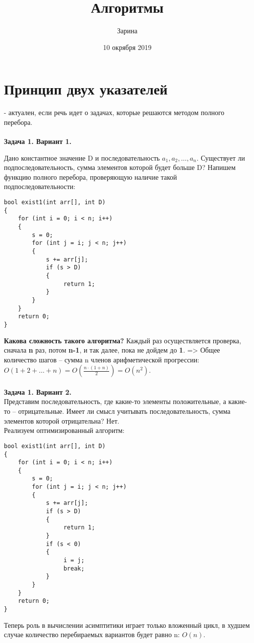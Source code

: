 \documentclass[a4paper,12pt]{article}
\author{Зарина}
\title{Алгоритмы}
\date{10 окрября 2019}
\begin{document}
\section {Принцип двух указателей}
- актуален, если речь идет о задачах, которые решаются методом полного перебора. \\ \\
\textbf{Задача 1. Вариант 1.} 

Дано константное значение D и последовательность {\bfseries  $a_{1}, a_{2}, … , a_{n}$}. Существует ли подпоследовательность, сумма элементов которой будет больше D? Напишем функцию полного перебора, проверяющую наличие такой подпоследовательности:

\lstset {language = C++, frame = single}
\begin{lstlisting}
bool exist1(int arr[], int D)
{
    for (int i = 0; i < n; i++)
    {
        s = 0;
        for (int j = i; j < n; j++)
        {
            s += arr[j];
            if (s > D)
            {
                 return 1;
            }
        }
    }
	return 0;
}
\end{lstlisting}

\textbf{Какова сложность такого алгоритма?} Каждый раз осуществляется проверка, сначала {\bfseries n} раз, потом {\bfseries n-1}, и так далее, пока не дойдем до {\bfseries 1}. => Общее количество шагов –  сумма n членов арифметической прогрессии: $O(1 + 2 + … + n) = O(\frac {n \cdot (1+n)} {2}) = O(n^2)$.\\ \\
\textbf{Задача 1. Вариант 2.}\\
Представим последовательность, где какие-то элементы положительные, а какие-то – отрицательные. Имеет ли смысл учитывать последовательность, сумма элементов которой отрицательна? Нет.\\
Реализуем оптимизированный алгоритм:

\begin{lstlisting}
bool exist1(int arr[], int D)
{
    for (int i = 0; i < n; i++)
    {
        s = 0;
        for (int j = i; j < n; j++)
        {
            s += arr[j];
            if (s > D)
            {
                 return 1;
            }
            if (s < 0)
            {
                 i = j;
                 break;
            }
        }
    }
	return 0;
}
\end{lstlisting}

Теперь роль в вычислении асимптитики играет только вложенный цикл, в худшем случае количество перебираемых вариантов будет равно n: $O(n)$.
\end{document}
